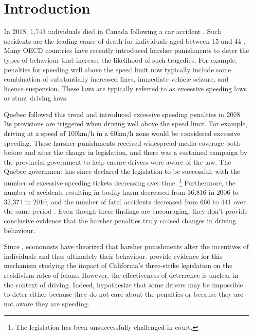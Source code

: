 \documentclass{cje}
\begin{document}

\maketitle


\section{Introduction}
\label{sec:Introduction}

In 2018, 1,743 individuals died in Canada following a car accident 
\citep{transcan2018}. 
Such accidents are the leading cause of death for individuals aged between 15 and 44
\citep{statscan2020}.   
Many OECD countries have recently introduced harsher punishments to deter 
the types of behaviour that increase the likelihood of such tragedies. 
For example, penalties for speeding well above the speed limit now typically include 
some combination of substantially increased fines, immediate vehicle seizure, and licence suspension.
These laws are typically referred to as excessive speeding laws or stunt driving laws. 

Quebec followed this trend and introduced excessive speeding penalties in 2008. 
Its provisions are triggered when driving well above the speed limit. 
For example, driving at a speed of 100km/h in a 60km/h zone would be considered excessive speeding.
These harsher punishments received widespread media coverage 
both before and after the change in legislation, 
and there was a sustained campaign by the provincial government 
to help ensure drivers were aware of the law. 
The Quebec government has since declared the legislation to be successful, 
with the number of excessive speeding tickets decreasing over time.%
\footnote{The legislation has been unsuccessfully challenged in court.}
%
Furthermore, the number of accidents resulting in bodily harm 
decreased from 36,816 in 2006 to 32,371 in 2010, 
and the number of fatal accidents decreased from 666 to 441 
over the same period 
\citep{saaq2011}. 
Even though these findings are encouraging, 
they don’t provide conclusive evidence that the harsher penalties truly caused changes in driving behaviour. 


Since 
\citet{becker1968b}, 
economists have theorized that harsher punishments 
alter the incentives of individuals and thus ultimately their behaviour. 
\citet{hellandtabarrok2007} 
provide evidence for this mechanism 
studying the impact of California’s three-strike legislation on the recidivism rates of felons. 
However, the effectiveness of deterrence is unclear in the context of driving. 
Indeed, 
\citet{bourgeonpicard2007} 
hypothesize that some drivers may be impossible to deter 
either because they do not care about the penalties or because they are not aware they are speeding.
\end{document}
